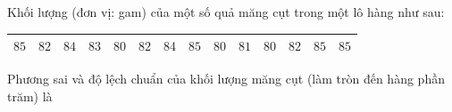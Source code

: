 \begin{ex}
Khối lượng (đơn vị: gam) của một số quả măng cụt trong một lô hàng như sau:
\begin{center}
\begin{tabular}{|c|c|c|c|c|c|c|c|c|c|c|c|c|c|}\hline
$85$ & $82$ & $84$ & $83$ & $80$ & $82$ & $84$ & $85$ & $80$ & $81$ & $80$ & $82$ & $85$ & $85$\\\hline
\end{tabular}
\end{center}
Phương sai và độ lệch chuẩn của khối lượng măng cụt (làm tròn đến hàng phần trăm) là
\end{ex}
